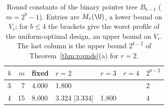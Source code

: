 \begin{table}[h]
\centering
\caption{Round constants of the binary pointer tree $B_{b-1}$ ($m=2^b-1$). Entries are $M_r(\U)$, a lower bound on $V_r$; for $b\le4$ the brackets give the worst profile of the uniform-optimal design, an upper bound on $V_r$. The last column is the upper bound $2^{b-2}$ of Theorem~\ref{thm:rounds}(a) for $r=2$.}
\label{tab:pointer}
\small
\begin{tabular}{rrlllll}
\toprule
$b$ & $m$ & fixed & $r=2$ & $r=3$ & $r=4$ & $2^{b-2}$ \\
\midrule
3 & 7 & 4.000 & 1.800 &  &  & 2 \\
4 & 15 & 8.000 & 3.324 [3.334] & 1.800 &  & 4 \\
\bottomrule
\end{tabular}
\end{table}
